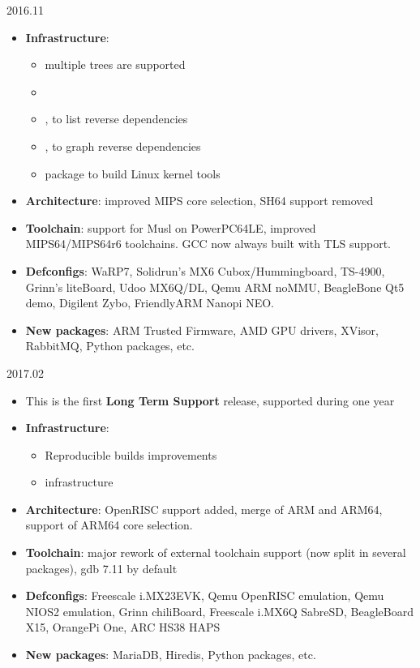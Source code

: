 \begin{frame}{2016.11}
  \begin{itemize}
  \item {\bf Infrastructure}:
    \begin{itemize}
    \item multiple  trees are supported
    \item {}
    \item {}, to list reverse dependencies
    \item {}, to graph reverse dependencies
    \item {} package to build Linux kernel tools
    \end{itemize}
  \item {\bf Architecture}: improved MIPS core selection, SH64 support
    removed
  \item {\bf Toolchain}: support for Musl on PowerPC64LE, improved
    MIPS64/MIPS64r6 toolchains. GCC now always built with TLS support.
  \item {\bf Defconfigs}: WaRP7, Solidrun's MX6 Cubox/Hummingboard,
    TS-4900, Grinn's liteBoard, Udoo MX6Q/DL, Qemu ARM noMMU,
    BeagleBone Qt5 demo, Digilent Zybo, FriendlyARM Nanopi NEO.
  \item {\bf New packages}: ARM Trusted Firmware, AMD GPU drivers,
    XVisor, RabbitMQ, Python packages, etc.
  \end{itemize}
\end{frame}

\begin{frame}{2017.02}
  \begin{itemize}
  \item This is the first {\bf Long Term Support} release, supported
    during one year
  \item {\bf Infrastructure}:
    \begin{itemize}
    \item Reproducible builds improvements
    \item {} infrastructure
    \end{itemize}
  \item {\bf Architecture}: OpenRISC support added, merge of ARM and
    ARM64, support of ARM64 core selection.
  \item {\bf Toolchain}: major rework of external toolchain support
    (now split in several packages), gdb 7.11 by default
  \item {\bf Defconfigs}: Freescale i.MX23EVK, Qemu OpenRISC
    emulation, Qemu NIOS2 emulation, Grinn chiliBoard, Freescale
    i.MX6Q SabreSD, BeagleBoard X15, OrangePi One, ARC HS38 HAPS
  \item {\bf New packages}: MariaDB, Hiredis, Python packages, etc.
  \end{itemize}
\end{frame}

